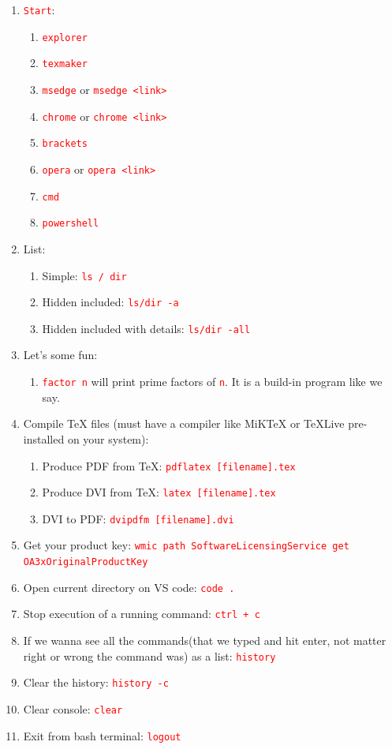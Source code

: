 \documentclass[12 pt, letterpaper]{extarticle}
\newcommand{\R}{\textcolor{red}} %
\newcommand{\T}{\texttt}
\begin{document}
\begin{enumerate}
	\item \R{\T{Start}}:
		\begin{enumerate}
			\item \R{\T{explorer}}
			\item \R{\T{texmaker}}
			\item \R{\T{msedge}} or \R{\T{msedge <link>}}
			\item \R{\T{chrome}} or \R{\T{chrome <link>}}
			\item \R{\T{brackets}}
			\item \R{\T{opera}} or \R{\T{opera <link>}}
			
			\item \R{\T{cmd}}
			\item \R{\T{powershell}}
		\end{enumerate}
	
	\item List:
		\begin{enumerate}
			\item Simple: \R{\T{ls / dir}}
			\item Hidden included: \R{\T{ls/dir -a}}
			\item Hidden included with details: \R{\T{ls/dir -all}}
		\end{enumerate}
		
	\item Let's some fun:
		\begin{enumerate}
			\item \R{\T{factor n}} will print prime factors of \R{\T{n}}. It is a build-in program like we say.
		\end{enumerate}
		
	\item Compile TeX files (must have a compiler like MiKTeX or TeXLive pre-installed on your system):
		\begin{enumerate}
			\item Produce PDF from TeX: \R{\T{pdflatex [filename].tex}}
			\item Produce DVI from TeX: \R{\T{latex [filename].tex}}
			\item DVI to PDF: \R{\T{dvipdfm [filename].dvi}}
		\end{enumerate}
	
	\item Get your product key: \R{\T{wmic path SoftwareLicensingService get OA3xOriginalProductKey}}
	
	\item Open current directory on VS code: \R{\T{code .}}
	\item Stop execution of a running command: \R{\T{ctrl + c}}
	\item If we wanna see all the commands(that we typed and hit enter, not matter right or wrong the command was) as a list: \R{\T{history}}
	\item Clear the history: \R{\T{history -c}}
	\item Clear console: \R{\T{clear}}
	\item Exit from bash terminal: \R{\T{logout}}
\end{enumerate}
\end{document}
